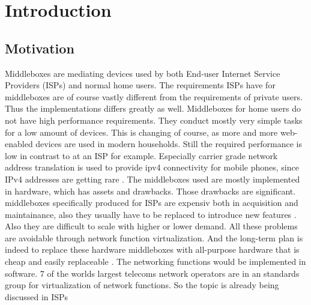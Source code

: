 \documentclass[11pt,a4paper,twoside,openright,bachelor,english]{netthesis}
\author{Simon Sternsdorf}
\begin{document}
%


\maketitle%





%

{\tableofcontents}
{\listoffigures}
{\listoftables}

\cleardoublepage


\chapter{Introduction}

\section{Motivation}
Middleboxes are mediating devices used by both End-user Internet Service Providers (ISPs) and normal home users. The requirements ISPs have for middleboxes are of course vastly different from the requirements of private users. Thus the implementations differs greatly as well. Middleboxes for home users do not have high performance requirements. They conduct mostly very simple tasks for a low amount of devices. This is changing of course, as more and more web-enabled devices are used in modern households. 
Still the required performance is low in contrast to at an ISP for example. Especially carrier grade network address translation is used to provide ipv4 connectivity for mobile phones, since IPv4 addresses are getting rare \cite{A10}. The middleboxes used are mostly implemented in hardware, which has assets and drawbacks. Those drawbacks are significant. 
middleboxes specifically produced for ISPs are expensiv both in acquisition and maintainance, also they usually have to be replaced to introduce new features \cite{WhiteP}. Also they are difficult to scale with higher or lower demand. All these problems are avoidable through network function virtualization. And the long-term plan is indeed to replace these hardware middleboxes with all-purpose hardware that is cheap and easily replaceable \cite{Click}. The networking functions would be implemented in software. 7 of the worlds largest telecoms network operators are in an standards group for virtualization of network functions. So the topic is already being discussed in ISPs \cite{NetDis} 
\end{document}
